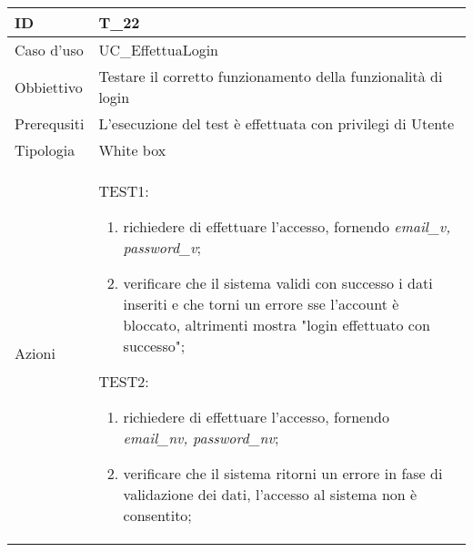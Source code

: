 \begin{table}[hb]
    \centering
    \begin{tabular}{ |p{2cm}|p{10cm}|  }
        \hline
        ID          & T\_22                                                         \\\hline
        Caso d'uso  & UC\_EffettuaLogin                                             \\\hline
        Obbiettivo  & Testare il corretto funzionamento della funzionalità di login \\\hline
        Prerequsiti & L'esecuzione del test è effettuata con privilegi di Utente    \\\hline
        Tipologia   & White box                                                     \\\hline
        Azioni      &
        TEST1:
        \begin{enumerate}[nosep, topsep=0pt]
            \item richiedere di effettuare l'accesso, fornendo \emph{email\_v, password\_v};
            \item verificare che il sistema validi con successo i dati inseriti e che torni un errore sse l'account è bloccato, altrimenti mostra "login effettuato con successo";
        \end{enumerate}
        \vspace{0.5cm} TEST2:
        \begin{enumerate}[nosep, topsep=0pt]
            \item richiedere di effettuare l'accesso, fornendo \emph{email\_nv, password\_nv};
            \item verificare che il sistema ritorni un errore in fase di validazione dei dati, l'accesso al sistema non è consentito;
        \end{enumerate}
        \\\hline
    \end{tabular}
\end{table}

